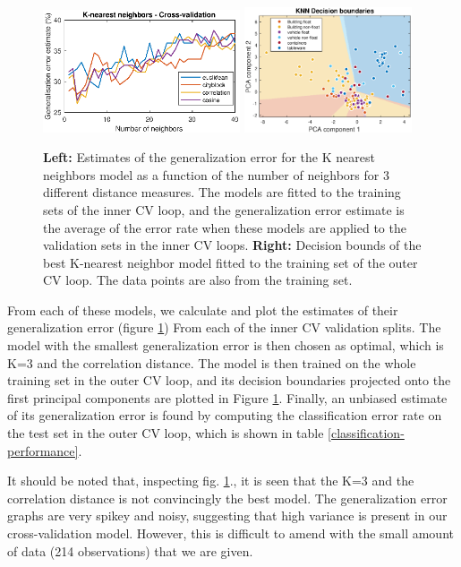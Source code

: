 \begin{figure}[H]
    \centering
    \includegraphics[width=0.52\textwidth]{fig/knn-crossval.eps}
    \includegraphics[width = 0.44\textwidth]{fig/knn-decision-bounds.eps}
    \caption{\textbf{Left:} Estimates of the generalization error for the K nearest neighbors model as a function of the number of neighbors for 3 different distance measures. The models are fitted to the training sets of the inner CV loop, and the generalization error estimate is the average of the error rate when these models are applied to the validation sets in the inner CV loops. \textbf{Right:} Decision bounds of the best K-nearest neighbor model fitted to the training set of the outer CV loop. The data points are also from the training set.}
    \label{knn-plots}
\end{figure}

From each of these models, we calculate and plot the estimates of their generalization error (figure \ref{knn-plots}) From each of the inner CV validation splits. The model with the smallest generalization error is then chosen as optimal, which is K=3 and the correlation distance. The model is then trained on the whole training set in the outer CV loop, and its decision boundaries projected onto the first principal components are plotted in Figure \ref{knn-plots}. Finally, an unbiased estimate of its generalization error is found by computing the classification error rate on the test set in the outer CV loop, which is shown in table \ref{classification-performance}.

It should be noted that, inspecting fig. \ref{knn-plots}., it is seen that the K=3 and the correlation distance is not convincingly the best model. The generalization error graphs are very spikey and noisy, suggesting that high variance is present in our cross-validation model. However, this is difficult to amend with the small amount of data (214 observations) that we are given. 
